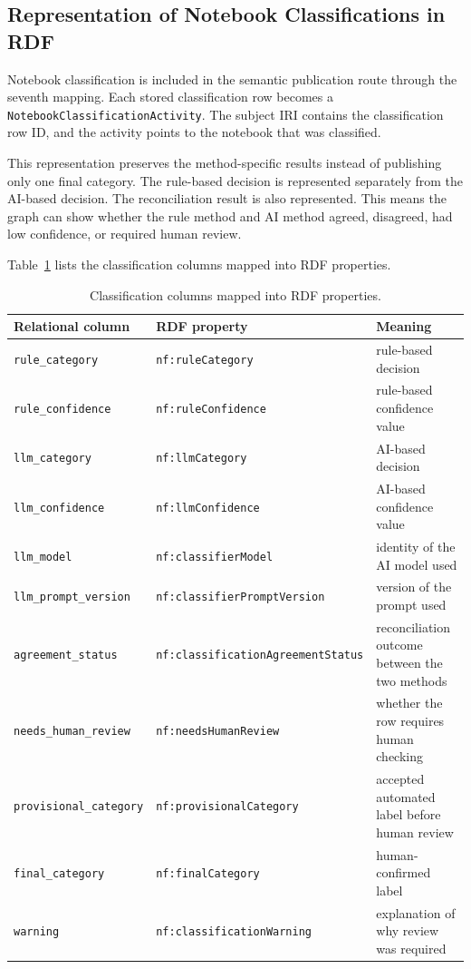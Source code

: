 \subsection{Representation of Notebook Classifications in RDF}

Notebook classification is included in the semantic publication route through the seventh mapping. Each stored classification row becomes a \texttt{Notebook\-Classification\-Activity}. The subject IRI contains the classification row ID, and the activity points to the notebook that was classified.

This representation preserves the method-specific results instead of publishing only one final category. The rule-based decision is represented separately from the AI-based decision. The reconciliation result is also represented. This means the graph can show whether the rule method and AI method agreed, disagreed, had low confidence, or required human review.

Table~\ref{tab:classification-rdf} lists the classification columns mapped into RDF properties.

\begin{table}[ht]
\centering
\caption{Classification columns mapped into RDF properties.}
\label{tab:classification-rdf}
\footnotesize
\begin{tabularx}{\textwidth}{@{}p{3.1cm}p{4.0cm}X@{}}
\toprule
Relational column & RDF property & Meaning\tabularnewline
\midrule
\texttt{rule\_category} & \texttt{nf:ruleCategory} & rule-based decision\tabularnewline
\texttt{rule\_confidence} & \texttt{nf:ruleConfidence} & rule-based confidence value\tabularnewline
\texttt{llm\_category} & \texttt{nf:llmCategory} & AI-based decision\tabularnewline
\texttt{llm\_confidence} & \texttt{nf:llmConfidence} & AI-based confidence value\tabularnewline
\texttt{llm\_model} & \texttt{nf:classifierModel} & identity of the AI model used\tabularnewline
\texttt{llm\_prompt\_version} & \texttt{nf:classifierPromptVersion} & version of the prompt used\tabularnewline
\texttt{agreement\_status} & \texttt{nf:classification}\linebreak\texttt{AgreementStatus} & reconciliation outcome between the two methods\tabularnewline
\texttt{needs\_human\_review} & \texttt{nf:needsHumanReview} & whether the row requires human checking\tabularnewline
\texttt{provisional\_category} & \texttt{nf:provisionalCategory} & accepted automated label before human review\tabularnewline
\texttt{final\_category} & \texttt{nf:finalCategory} & human-confirmed label\tabularnewline
\texttt{warning} & \texttt{nf:classificationWarning} & explanation of why review was required\tabularnewline
\bottomrule
\end{tabularx}
\end{table}

